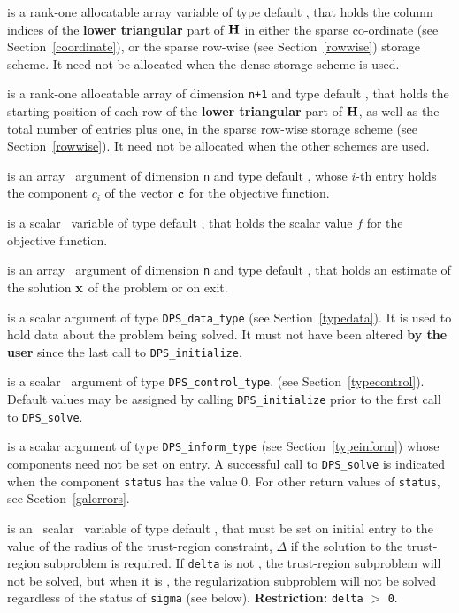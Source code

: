 \documentclass{galahad}
\newcommand{\packagename}{DPS}
\begin{document}
\begin{description}
\begin{description}
 is a rank-one allocatable array variable of type default \integer,
that holds the column indices of the {\bf lower triangular} part of
${\mathbf{H}}$ in either the sparse co-ordinate
(see Section~\ref{coordinate}), or the sparse row-wise
(see Section~\ref{rowwise}) storage scheme.
It need not be allocated when the dense
storage scheme is used.

 is a rank-one allocatable array of dimension {\tt n+1} and type
default \integer, that holds the starting position of
each row of the {\bf lower triangular} part of ${\mathbf{H}}$, as well
as the total number of entries plus one, in the sparse row-wise storage
scheme (see Section~\ref{rowwise}). It need not be allocated when the
other schemes are used.
\end{description}

 is an array \intentin\ argument of dimension {\tt n} and
type default \realdp,  whose $i$-th entry holds the component $c_i$ of
the vector ${\mathbf{c}}$ for the objective function.

 is a scalar \intentin\ variable of type default \realdp, that holds
the scalar value $f$ for the objective function.

 is an array \intentout\ argument of dimension {\tt n} and
type default \realdp, that holds an estimate of the solution ${\mathbf{x}}$
of the problem  or  on exit.

 is a scalar \intentinout argument of type
{\tt \packagename\_data\_type}
(see Section~\ref{typedata}). It is used to hold data about the problem being
solved. It must not have been altered {\bf by the user} since the last call to
{\tt \packagename\_initialize}.

 is a scalar \intentin\ argument of type
{\tt \packagename\_control\_type}.
(see Section~\ref{typecontrol}).
Default values may be assigned by calling {\tt \packagename\_initialize}
prior to the first call to {\tt \packagename\_solve}.

 is a scalar \intentinout argument of type
{\tt \packagename\_inform\_type}
(see Section~\ref{typeinform}) whose components need not be set on entry.
A successful call to
{\tt \packagename\_solve}
is indicated when the  component {\tt status} has the value 0.
For other return values of {\tt status}, see Section~\ref{galerrors}.

 is an \optional\ scalar \intentin\ variable of type default
\realdp, that must be set on initial entry
to the value of the radius of the trust-region constraint, $\Delta$
if the solution to the trust-region subproblem  is required.
If {\tt delta} is not \present, the trust-region subproblem will not be
solved, but when it is \present, the regularization subproblem will not be
solved regardless of the status of {\tt sigma} (see below).
{\bf Restriction: } {\tt delta} $>$ {\tt 0}.


\end{description}
\end{document}
